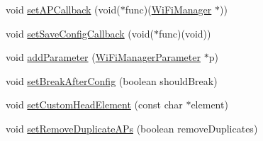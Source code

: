 \begin{DoxyCompactItemize}
\item 
void \hyperlink{class_wi_fi_manager_a353ab556f96020ad7a08e9a91cea8bea}{set\+A\+P\+Callback} (void($\ast$func)(\hyperlink{class_wi_fi_manager}{Wi\+Fi\+Manager} $\ast$))
\item 
void \hyperlink{class_wi_fi_manager_a3666ca145de5e28d943db54fcb204e65}{set\+Save\+Config\+Callback} (void($\ast$func)(void))
\item 
void \hyperlink{class_wi_fi_manager_a62907428e5874de097d83c33ef46c80d}{add\+Parameter} (\hyperlink{class_wi_fi_manager_parameter}{Wi\+Fi\+Manager\+Parameter} $\ast$p)
\item 
void \hyperlink{class_wi_fi_manager_ad48fd74c893d12778121fa239d245cc9}{set\+Break\+After\+Config} (boolean should\+Break)
\item 
void \hyperlink{class_wi_fi_manager_a85570bcfe03da48c4be75b8e4302c4db}{set\+Custom\+Head\+Element} (const char $\ast$element)
\item 
void \hyperlink{class_wi_fi_manager_a4dd1dbf4f22900f226a3897b88155212}{set\+Remove\+Duplicate\+A\+Ps} (boolean remove\+Duplicates)
\end{DoxyCompactItemize}
